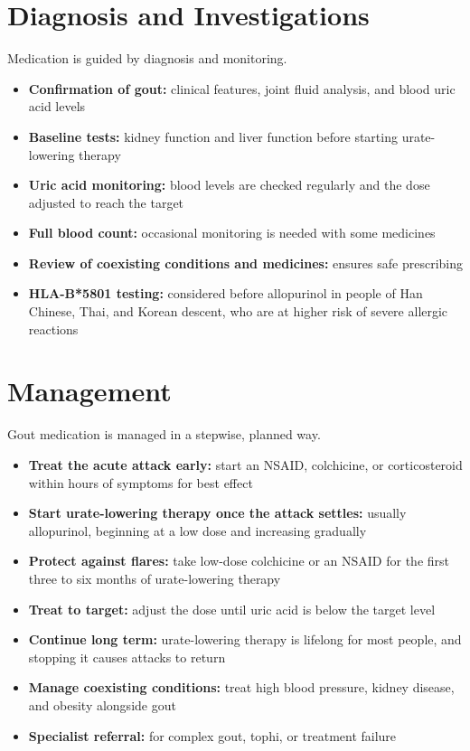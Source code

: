 \section*{Diagnosis and Investigations}
Medication is guided by diagnosis and monitoring.

\begin{itemize}
    \item \textbf{Confirmation of gout:} clinical features, joint fluid analysis, and blood uric acid levels
    \item \textbf{Baseline tests:} kidney function and liver function before starting urate-lowering therapy
    \item \textbf{Uric acid monitoring:} blood levels are checked regularly and the dose adjusted to reach the target
    \item \textbf{Full blood count:} occasional monitoring is needed with some medicines
    \item \textbf{Review of coexisting conditions and medicines:} ensures safe prescribing
    \item \textbf{HLA-B*5801 testing:} considered before allopurinol in people of Han Chinese, Thai, and Korean descent, who are at higher risk of severe allergic reactions
\end{itemize}

\section*{Management}
Gout medication is managed in a stepwise, planned way.

\begin{itemize}
    \item \textbf{Treat the acute attack early:} start an NSAID, colchicine, or corticosteroid within hours of symptoms for best effect
    \item \textbf{Start urate-lowering therapy once the attack settles:} usually allopurinol, beginning at a low dose and increasing gradually
    \item \textbf{Protect against flares:} take low-dose colchicine or an NSAID for the first three to six months of urate-lowering therapy
    \item \textbf{Treat to target:} adjust the dose until uric acid is below the target level
    \item \textbf{Continue long term:} urate-lowering therapy is lifelong for most people, and stopping it causes attacks to return
    \item \textbf{Manage coexisting conditions:} treat high blood pressure, kidney disease, and obesity alongside gout
    \item \textbf{Specialist referral:} for complex gout, tophi, or treatment failure
\end{itemize}

